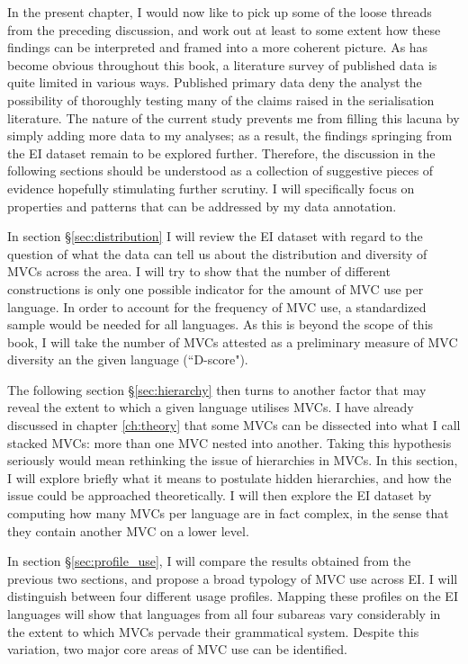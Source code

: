 In the present chapter, I would now like to pick up some of the loose threads from the preceding discussion, and work out at least to some extent how these findings can be interpreted and framed into a more coherent picture. As has become obvious throughout this book, a literature survey of published data is quite limited in various ways. Published primary data deny the analyst the possibility of thoroughly testing many of the claims raised in the serialisation literature. The nature of the current study prevents me from filling this lacuna by simply adding more data to my analyses; as a result, the findings springing from the EI dataset remain to be explored further. Therefore, the discussion in the following sections should be understood as a collection of suggestive pieces of evidence hopefully stimulating further scrutiny. I will specifically focus on properties and patterns that can be addressed by my data annotation.

In section §\ref{sec:distribution} I will review the EI dataset with regard to the question of what the data can tell us about the distribution and diversity of MVCs across the area. I will try to show that the number of different constructions is only one possible indicator for the amount of MVC use per language. In order to account for the frequency of MVC use, a standardized sample would be needed for all languages. As this is beyond the scope of this book, I will take the number of MVCs attested as a preliminary measure of MVC diversity an the given language (``D-score").

The following section §\ref{sec:hierarchy} then turns to another factor that may reveal the extent to which a given language utilises MVCs. I have already discussed in chapter \ref{ch:theory} that some MVCs can be dissected into what I call stacked MVCs: more than one MVC nested into another. Taking this hypothesis seriously would mean rethinking the issue of hierarchies in MVCs. In this section, I will explore briefly what it means to postulate hidden hierarchies, and how the issue could be approached theoretically. I will then explore the EI dataset by computing how many MVCs per language are in fact complex, in the sense that they contain another MVC on a lower level.

In section §\ref{sec:profile_use}, I will compare the results obtained from the previous two sections, and propose a broad typology of MVC use across EI. I will distinguish between four different usage profiles. Mapping these profiles on the EI languages will show that languages from all four subareas vary considerably in the extent to which MVCs pervade their grammatical system. Despite this variation, two major core areas of MVC use can be identified.

